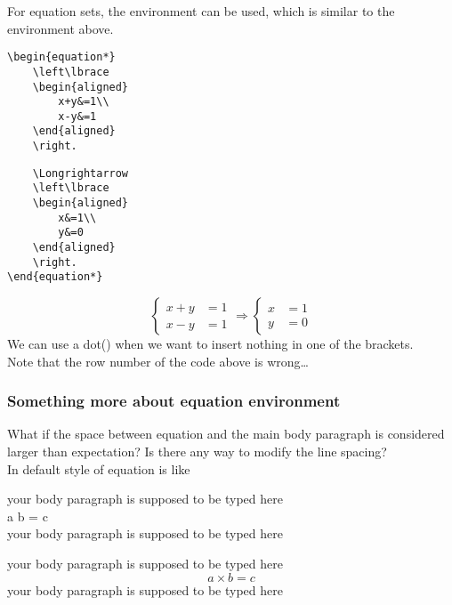 \begin{frame}[fragile]
	For equation sets, the  environment can be used, which is similar to the  environment above.
	\begin{example}
		\begin{minipage}{0.49\linewidth}
			\begin{verbatim}
\begin{equation*}
    \left\lbrace
    \begin{aligned}
        x+y&=1\\
        x-y&=1
    \end{aligned}
    \right.
			\end{verbatim}
		\end{minipage}
		\begin{minipage}{0.49\linewidth}
			\begin{verbatim}
    \Longrightarrow
    \left\lbrace
    \begin{aligned}
        x&=1\\
        y&=0
    \end{aligned}
    \right.
\end{equation*}
			\end{verbatim}
		\end{minipage}
	\end{example}	
	\begin{equation*}
	\left\lbrace\begin{aligned}
		x+y&=1\\x-y&=1
	\end{aligned}\right.\Longrightarrow
	\left\lbrace\begin{aligned}
		x&=1\\y&=0
	\end{aligned}\right.
	\end{equation*}	
	We can use a dot() when we want to insert nothing in one of the brackets.
	\\Note that the row number of the code above is wrong\dots
\end{frame}

\begin{frame}
	\frametitle{Something more about equation environment}
    What if the space between equation and the main body paragraph is considered larger than expectation? Is there any way to modify the line spacing?
\\In default style of equation is like
    \begin{example}
		your body paragraph is supposed to be typed here\\
		a  b = c \\
		your body paragraph is supposed to be typed here\\
	\end{example}
    your body paragraph is supposed to be typed here
        \begin{equation}
         a \times b =c
        \end{equation}
    your body paragraph is supposed to be typed here
\end{frame}

